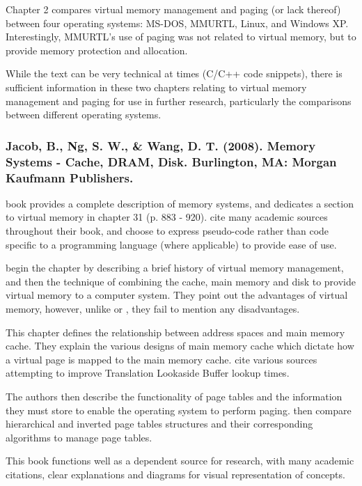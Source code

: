 Chapter 2 compares virtual memory management and paging (or lack thereof) between four operating systems: MS-DOS, MMURTL, Linux, and Windows XP. Interestingly, MMURTL's use of paging was not related to virtual memory, but to provide memory protection and allocation.

While the text can be very technical at times (C/C++ code snippets), there is sufficient information in these two chapters relating to virtual memory management and paging for use in further research, particularly the comparisons between different operating systems.

\subsubsection*{Jacob, B., Ng, S. W., \& Wang, D. T. (2008). Memory Systems - Cache, DRAM, Disk. Burlington, MA: Morgan Kaufmann Publishers.}

 book provides a complete description of memory systems, and dedicates a section to virtual memory in chapter 31 (p. 883 - 920). \citet{Jacob2008} cite many academic sources throughout their book, and choose to express pseudo-code rather than code specific to a programming language (where applicable) to provide ease of use.

\citet{Jacob2008} begin the chapter by describing a brief history of virtual memory management, and then the technique of combining the cache, main memory and disk to provide virtual memory to a computer system. They point out the advantages of virtual memory, however, unlike \citet{Blanchet2012} or \citet{Blunden2003}, they fail to mention any disadvantages.

This chapter defines the relationship between address spaces and main memory cache. They explain the various designs of main memory cache which dictate how a virtual page is mapped to the main memory cache. \citet{Jacob2008} cite various sources attempting to improve Translation Lookaside Buffer lookup times.

The authors then describe the functionality of page tables and the information they must store to enable the operating system to perform paging. \citet{Jacob2008} then compare hierarchical and inverted page tables structures and their corresponding algorithms to manage page tables.

This book functions well as a dependent source for research, with many academic citations, clear explanations and diagrams for visual representation of concepts.


